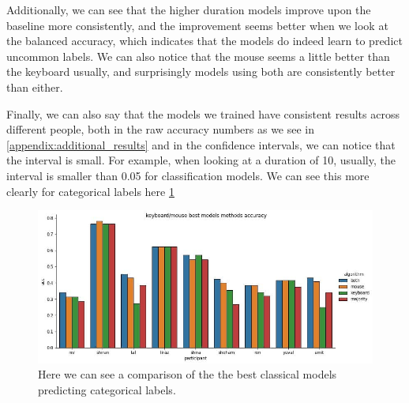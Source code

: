 \documentclass[../main.tex]{subfiles}
\begin{document}
    Additionally, we can see that the higher duration models improve upon the baseline more consistently, 
    and the improvement seems better when we look at the balanced accuracy, which indicates that the models do indeed learn to predict uncommon labels. 
    We can also notice that the mouse seems a little better than the keyboard usually, and surprisingly models using both are consistently better than either. 

    Finally, we can also say that the models we trained have consistent results across different people, both in the raw accuracy numbers as we see in 
    \ref{appendix:additional_results} and in the confidence intervals, we can notice that the interval is small. For example, when looking at a duration of 10, 
    usually, the interval is smaller than 0.05 for classification models.
    We can see this more clearly for categorical labels here \ref{fig:categorical_kbm}

    \begin{figure}
        \centering
        \includegraphics[width=14cm]{figures/results/categorical_kbm}   
        \caption{Here we can see a comparison of the the best classical models predicting categorical labels.}
        \label{fig:categorical_kbm} 
    \end{figure}
\end{document}
